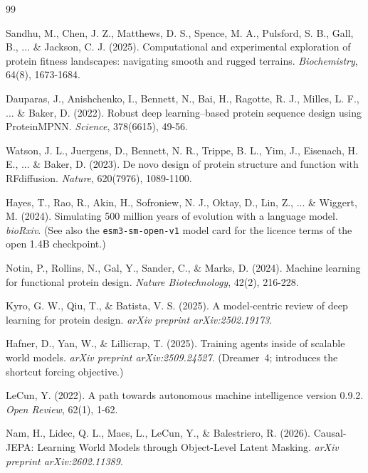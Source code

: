 \documentclass[12pt, a4paper]{article}
\begin{document}
\begin{thebibliography}{99}

Sandhu, M., Chen, J. Z., Matthews, D. S., Spence, M. A., Pulsford, S. B., Gall, B., ... \& Jackson, C. J. (2025).
\newblock Computational and experimental exploration of protein fitness landscapes: navigating smooth and rugged terrains.
\newblock \textit{Biochemistry}, 64(8), 1673-1684.


Dauparas, J., Anishchenko, I., Bennett, N., Bai, H., Ragotte, R. J., Milles, L. F., ... \& Baker, D. (2022). \newblock Robust deep learning–based protein sequence design using ProteinMPNN. \newblock \textit{Science}, 378(6615), 49-56.


Watson, J. L., Juergens, D., Bennett, N. R., Trippe, B. L., Yim, J., Eisenach, H. E., ... \& Baker, D. (2023). \newblock De novo design of protein structure and function with RFdiffusion. \newblock \textit{Nature}, 620(7976), 1089-1100.


Hayes, T., Rao, R., Akin, H., Sofroniew, N. J., Oktay, D., Lin, Z., ... \& Wiggert, M. (2024). \newblock Simulating 500 million years of evolution with a language model. \newblock \textit{bioRxiv}. (See also the \texttt{esm3-sm-open-v1} model card for the licence terms of the open 1.4B checkpoint.)


Notin, P., Rollins, N., Gal, Y., Sander, C., \& Marks, D. (2024). \newblock Machine learning for functional protein design. \newblock \textit{Nature Biotechnology}, 42(2), 216-228.


Kyro, G. W., Qiu, T., \& Batista, V. S. (2025). \newblock A model-centric review of deep learning for protein design. \newblock \textit{arXiv preprint arXiv:2502.19173}.


Hafner, D., Yan, W., \& Lillicrap, T. (2025). \newblock Training agents inside of scalable world models. \newblock \textit{arXiv preprint arXiv:2509.24527}. (Dreamer~4; introduces the shortcut forcing objective.)


LeCun, Y. (2022). \newblock A path towards autonomous machine intelligence version 0.9.2. \newblock \textit{Open Review}, 62(1), 1-62.


Nam, H., Lidec, Q. L., Maes, L., LeCun, Y., \& Balestriero, R. (2026). \newblock Causal-JEPA: Learning World Models through Object-Level Latent Masking. \newblock \textit{arXiv preprint arXiv:2602.11389}.



\end{thebibliography}
\end{document}
